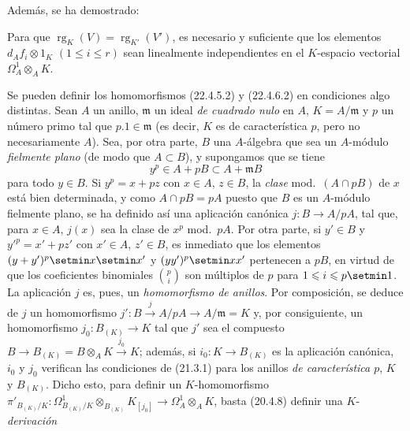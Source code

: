 Además, se ha demostrado:

\begin{corollary}[22.4.7.4]
\label{0.22.4.7.4-fr}
Para que $\operatorname{rg}_K(V)=\operatorname{rg}_{K'}(V')$, es necesario y suficiente que los elementos
$d_Af_i\otimes1_K$ $(1\leqslant i\leqslant r)$ sean linealmente
independientes en el $K$-espacio vectorial $\Omega^1_A\otimes_AK$.
\end{corollary}

\begin{remark}[22.4.8]
\label{0.22.4.8-fr}
Se pueden definir los homomorfismos (22.4.5.2) y (22.4.6.2) en condiciones
algo distintas. Sean $A$ un anillo, $\mathfrak m$ un ideal \emph{de cuadrado
nulo} en $A$, $K=A/\mathfrak m$ y $p$ un número primo tal que
$p.1\in\mathfrak m$ (es decir, $K$ es de característica $p$, pero no
necesariamente $A$). Sea, por otra parte, $B$ una $A$-álgebra que sea un $A$-módulo
\emph{fielmente plano} (de modo que $A\subset B$), y supongamos que se tiene
\begin{equation}
\label{0.22.4.8.1-fr}
  y^p\in A+pB\subset A+\mathfrak mB
  \tag{22.4.8.1}
\end{equation}
para todo $y\in B$. Si $y^p=x+pz$ con $x\in A$, $z\in B$, la \emph{clase}
mod.~$(A\cap pB)$ de $x$ está bien determinada, y como $A\cap pB=pA$ puesto que
$B$ es un $A$-módulo fielmente plano, se ha definido así una aplicación
canónica $j:B\longrightarrow A/pA$, tal que, para $x\in A$, $j(x)$ sea la
clase de $x^p$ mod.~$pA$. Por otra parte, si $y'\in B$ y
$y'^p=x'+pz'$ con $x'\in A$, $z'\in B$, es inmediato que los elementos
$(y+y')^p\setmin x\setmin x'$ y $(yy')^p\setmin xx'$ pertenecen a $pB$, en virtud de que los
coeficientes binomiales $\binom pi$ son múltiplos de $p$ para
$1\leqslant i\leqslant p\setmin 1$. La aplicación $j$ es, pues, un
\emph{homomorfismo de anillos}. Por composición, se deduce de $j$ un
homomorfismo $j':B\xrightarrow{j}A/pA\longrightarrow A/\mathfrak m=K$ y, por
consiguiente, un homomorfismo $j_0:B_{(K)}\longrightarrow K$ tal que $j'$ sea el
compuesto $B\longrightarrow B_{(K)}=B\otimes_AK\xrightarrow{j_0}K$; además,
si $i_0:K\longrightarrow B_{(K)}$ es la aplicación canónica, $i_0$ y $j_0$
verifican las condiciones de (21.3.1) para los anillos \emph{de característica
$p$}, $K$ y $B_{(K)}$. Dicho esto, para definir un $K$-homomorfismo
$\pi'_{B_{(K)}/K}:\Omega^1_{B_{(K)}/K}\otimes_{B_{(K)}}K_{[j_0]}
\longrightarrow\Omega^1_A\otimes_AK$, basta (20.4.8) definir una
$K$-\emph{derivación}
\begin{equation}
\label{0.22.4.8.2-fr}

\end{equation}
\end{remark}
